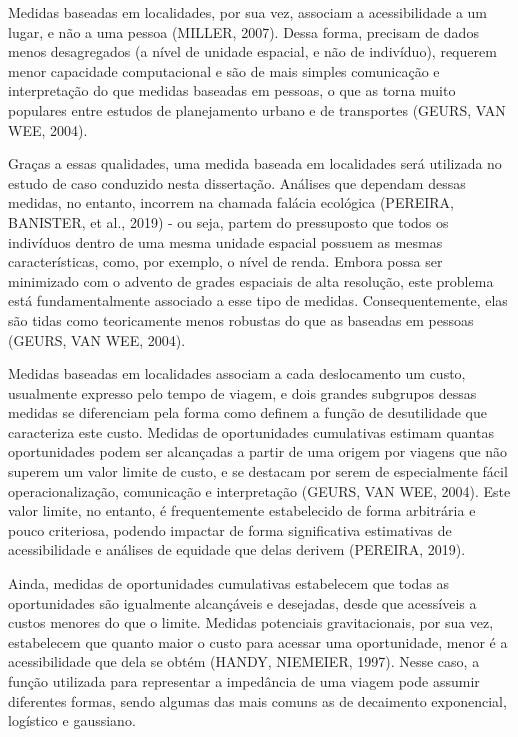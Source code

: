 \documentclass[msc,numbers]{coppe}
\begin{document}
  Medidas baseadas em localidades, por sua vez, associam a acessibilidade a um lugar, e não a uma pessoa (MILLER, 2007). Dessa forma, precisam de dados menos desagregados (a nível de unidade espacial, e não de indivíduo), requerem menor capacidade computacional e são de mais simples comunicação e interpretação do que medidas baseadas em pessoas, o que as torna muito populares entre estudos de planejamento urbano e de transportes (GEURS, VAN WEE, 2004).

  Graças a essas qualidades, uma medida baseada em localidades será utilizada no estudo de caso conduzido nesta dissertação. Análises que dependam dessas medidas, no entanto, incorrem na chamada falácia ecológica (PEREIRA, BANISTER, et al., 2019) - ou seja, partem do pressuposto que todos os indivíduos dentro de uma mesma unidade espacial possuem as mesmas características, como, por exemplo, o nível de renda. Embora possa ser minimizado com o advento de grades espaciais de alta resolução, este problema está fundamentalmente associado a esse tipo de medidas. Consequentemente, elas são tidas como teoricamente menos robustas do que as baseadas em pessoas (GEURS, VAN WEE, 2004).

  Medidas baseadas em localidades associam a cada deslocamento um custo, usualmente expresso pelo tempo de viagem, e dois grandes subgrupos dessas medidas se diferenciam pela forma como definem a função de desutilidade que caracteriza este custo. Medidas de oportunidades cumulativas estimam quantas oportunidades podem ser alcançadas a partir de uma origem por viagens que não superem um valor limite de custo, e se destacam por serem de especialmente fácil operacionalização, comunicação e interpretação (GEURS, VAN WEE, 2004). Este valor limite, no entanto, é frequentemente estabelecido de forma arbitrária e pouco criteriosa, podendo impactar de forma significativa estimativas de acessibilidade e análises de equidade que delas derivem (PEREIRA, 2019).

  Ainda, medidas de oportunidades cumulativas estabelecem que todas as oportunidades são igualmente alcançáveis e desejadas, desde que acessíveis a custos menores do que o limite. Medidas potenciais gravitacionais, por sua vez, estabelecem que quanto maior o custo para acessar uma oportunidade, menor é a acessibilidade que dela se obtém (HANDY, NIEMEIER, 1997). Nesse caso, a função utilizada para representar a impedância de uma viagem pode assumir diferentes formas, sendo algumas das mais comuns as de decaimento exponencial, logístico e gaussiano.
\end{document}
